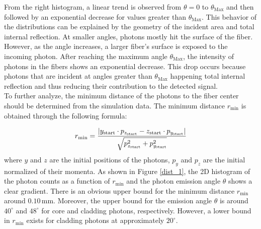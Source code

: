     From the right histogram, a linear trend is observed from $\theta = 0$ to $\theta_{\text{Max}}$ and then followed by an exponential decrease for values greater than $\theta_{\text{Max}}$. This behavior of the distributions can be explained by the geometry of the incident area and total internal reflection. At smaller angles, photons mostly hit the surface of the fiber. However, as the angle increases, a larger fiber's surface is exposed to the incoming photon.
    After reaching the maximum angle $\theta_{\text{Max}}$, the intensity of photons in the fibers shows an exponential decrease. This drop occurs because photons that are incident at angles greater than $\theta_{\text{Max}}$ happening total internal reflection and thus reducing their contribution to the detected signal. \\ 


    To further analyze, the minimum distance of the photons to the fiber center should be determined from the simulation data. The minimum distance $r_{\text{min}}$ is obtained through the following formula:

        \[
            r_{\text{min}} = \frac{\abs{{y_{\text{start}} \cdot p_{z_{\text{start}}} - z_{\text{start}} \cdot p_{y_{\text{start}}}}}}{\sqrt{p_{z_{\text{start}}}^2 + p_{y_{\text{start}}}^2}}
        \]
    where \( y \) and \( z \) are the initial positions of the photons, \( p_y \) and \( p_z \) are the initial normalized of their momenta. As shown in Figure \ref{dist_1}, the 2D histogram of the photon counts as a function of \( r_{\text{min}} \) and the photon emission angle \( \theta \) shows a clear gradient. There is an obvious upper bound for the minimum distance \( r_{\text{min}} \) around \( 0.10\,\text{mm} \). Moreover, the upper bound for the emission angle \( \theta \) is around \( 40^\circ \) and \( 48^\circ \) for core and cladding photons, respectively. However, a lower bound in \( r_{\text{min}} \) exists for cladding photons at approximately \( 20^\circ \). \\
    
